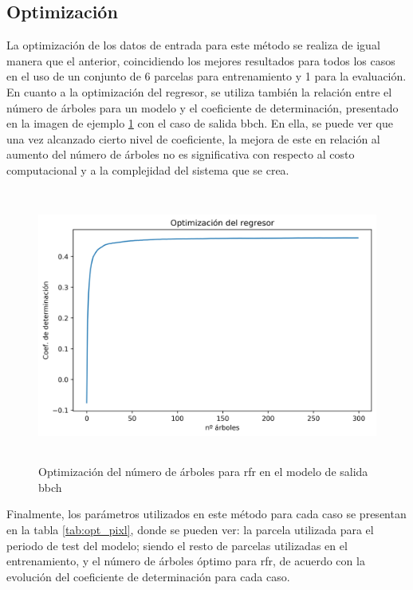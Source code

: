 \subsection{Optimización}
\par La optimización de los datos de entrada para este método se realiza de igual manera que el anterior, coincidiendo los mejores resultados para todos los casos en el uso de un conjunto de 6 parcelas para entrenamiento y 1 para la evaluación. En cuanto a la optimización del regresor, se utiliza también la relación entre el número de árboles para un modelo y el coeficiente de determinación, presentado en la imagen de ejemplo \ref{fig:opt_pixl} con el caso de salida \gls{bbch}. En ella, se puede ver que una vez alcanzado cierto nivel de coeficiente, la mejora de este en relación al aumento del número de árboles no es significativa con respecto al costo computacional y a la complejidad del sistema que se crea. 
\begin{figure}[h]
    \centering
    \includegraphics[height=9cm]{archivos/tfg/opt_tree_bbch_pixel} 
    \caption{Optimización del número de árboles para \gls{rfr} en el modelo de salida \gls{bbch}}
    \label{fig:opt_pixl}
\end{figure}

\par Finalmente, los parámetros utilizados en este método para cada caso se presentan en la tabla \ref{tab:opt_pixl}, donde se pueden ver: la parcela utilizada para el periodo de test del modelo; siendo el resto de parcelas utilizadas en el entrenamiento, y el número de árboles óptimo para \gls{rfr}, de acuerdo con la evolución del coeficiente de determinación para cada caso.

